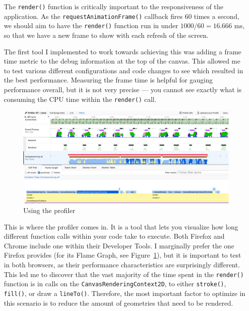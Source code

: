 \documentclass[hyphens]{final_report}
\begin{document}
The \texttt{render()} function is critically important to the responsiveness of the application. As the \texttt{requestAnimationFrame()} callback fires 60 times a second, we should aim to have the \texttt{render()} function run in under \(1000/60=16.666\) ms, so that we have a new frame to show with each refresh of the screen. 

The first tool I implemented to work towards achieving this was adding a frame time metric to the debug information at the top of the canvas. This allowed me to test various different configurations and code changes to see which resulted in the best performance. Measuring the frame time is helpful for gauging performance overall, but it is not very precise --- you cannot see exactly what is consuming the CPU time within the \texttt{render()} call.

\begin{figure}[ht]
    \centering
    \includegraphics[width=\textwidth]{../proof-of-concepts/4-rendering-osm-data/screenshots/profiling.png}
    \caption{Using the profiler}\label{fig:profiling}
\end{figure}

This is where the profiler comes in. It is a tool that lets you visualize how long different function calls within your code take to execute. Both Firefox and Chrome include one within their Developer Tools. I marginally prefer the one Firefox provides (for its Flame Graph, see Figure~\ref{fig:profiling}), but it is important to test in both browsers, as their performance characteristics are surprisingly different. This led me to discover that the vast majority of the time spent in the \texttt{render()} function is in calls on the \texttt{CanvasRenderingContext2D}, to either \texttt{stroke()}, \texttt{fill()}, or draw a \texttt{lineTo()}. Therefore, the most important factor to optimize in this scenario is to reduce the amount of geometries that need to be rendered.
\end{document}
